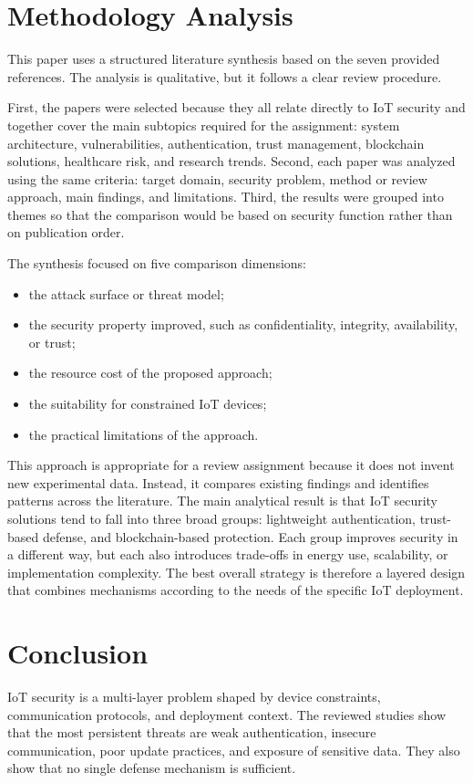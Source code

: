 \documentclass[conference]{IEEEtran}
\begin{document}
\section{Methodology Analysis}
This paper uses a structured literature synthesis based on the seven provided references. The analysis is qualitative, but it follows a clear review procedure.

First, the papers were selected because they all relate directly to IoT security and together cover the main subtopics required for the assignment: system architecture, vulnerabilities, authentication, trust management, blockchain solutions, healthcare risk, and research trends. Second, each paper was analyzed using the same criteria: target domain, security problem, method or review approach, main findings, and limitations. Third, the results were grouped into themes so that the comparison would be based on security function rather than on publication order.

The synthesis focused on five comparison dimensions:
\begin{itemize}
\item the attack surface or threat model;
\item the security property improved, such as confidentiality, integrity, availability, or trust;
\item the resource cost of the proposed approach;
\item the suitability for constrained IoT devices;
\item the practical limitations of the approach.
\end{itemize}

This approach is appropriate for a review assignment because it does not invent new experimental data. Instead, it compares existing findings and identifies patterns across the literature. The main analytical result is that IoT security solutions tend to fall into three broad groups: lightweight authentication, trust-based defense, and blockchain-based protection. Each group improves security in a different way, but each also introduces trade-offs in energy use, scalability, or implementation complexity. The best overall strategy is therefore a layered design that combines mechanisms according to the needs of the specific IoT deployment.

\section{Conclusion}
IoT security is a multi-layer problem shaped by device constraints, communication protocols, and deployment context. The reviewed studies show that the most persistent threats are weak authentication, insecure communication, poor update practices, and exposure of sensitive data. They also show that no single defense mechanism is sufficient.
\end{document}
